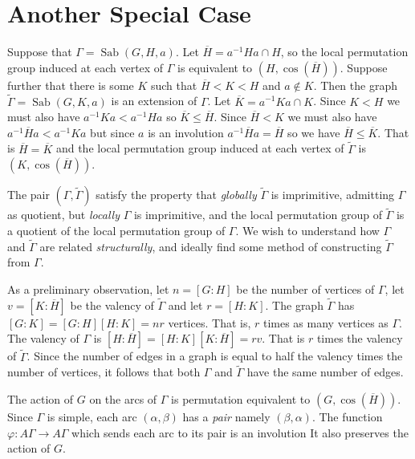 \documentclass[12pt]{amsart}
\theoremstyle{plain}
\theoremstyle{definition}
\theoremstyle{remark}
\DeclareMathOperator{\sab}{Sab}
\begin{document}
\newpage
\section{Another Special Case}

Suppose that $\Gamma = \sab(G,H,a)$.
Let $\overline{H} = a^{-1}Ha \cap H$,
so the local permutation group induced at each vertex of $\Gamma$
is equivalent to $(H, \cos(\overline{H}))$.
Suppose further that there is some $K$ such that $\overline{H} < K < H$
and $a \not\in K$. Then the graph $\widetilde{\Gamma} = \sab(G,K,a)$
is an extension of $\Gamma$.
Let $\overline{K} = a^{-1}Ka \cap K$.
Since $K < H$ we must also have $a^{-1}Ka < a^{-1}Ha$
so $\overline{K} \leq \overline{H}$.
Since $\overline{H} < K$ we must also have
$a^{-1}\overline{H}a < a^{-1}Ka$
but since $a$ is an involution $a^{-1}\overline{H}a = \overline{H}$
so we have $\overline{H} \leq \overline{K}$.
That is $\overline{H} = \overline{K}$
and the local permutation group induced at each vertex of
$\widetilde{\Gamma}$ is $(K, \cos(\overline{H}))$.

The pair $(\Gamma,\widetilde{\Gamma})$ satisfy the property that
{\it globally} $\widetilde{\Gamma}$ is imprimitive,
admitting $\Gamma$ as quotient, but {\it locally}
$\Gamma$ is imprimitive, and the local permutation group of
$\widetilde{\Gamma}$ is a quotient of the local permutation
group of $\Gamma$. We wish to understand how $\Gamma$
and $\widetilde{\Gamma}$ are related {\it structurally},
and ideally find some method of constructing $\widetilde{\Gamma}$
from $\Gamma$.

As a preliminary observation, let $n = [G:H]$ be the number of vertices of $\Gamma$,
let $v = [K:\overline{H}]$ be the valency of $\widetilde{\Gamma}$
and let $r = [H:K]$.
The graph $\widetilde{\Gamma}$ has $[G:K] = [G:H][H:K] = nr$
vertices. That is, $r$ times as many vertices as $\Gamma$.
The valency of $\Gamma$ is $[H:\overline{H}] = [H:K][K:\overline{H}] = rv$.
That is $r$ times the valency of $\widetilde{\Gamma}$.
Since the number of edges in a graph is equal to half the
valency times the number of vertices, it follows that
both $\Gamma$ and $\widetilde{\Gamma}$ have the same number of edges.
\hfill \break

The action of $G$ on the arcs of $\Gamma$ is permutation equivalent
to $(G, \cos(\overline{H}))$.
Since $\Gamma$ is simple, each arc $(\alpha,\beta)$ has a {\it pair}
namely $(\beta,\alpha)$.
The function $\varphi : A \Gamma \to A \Gamma$ 
which sends each arc to its pair is an involution
It also preserves the action of $G$.
\end{document}
